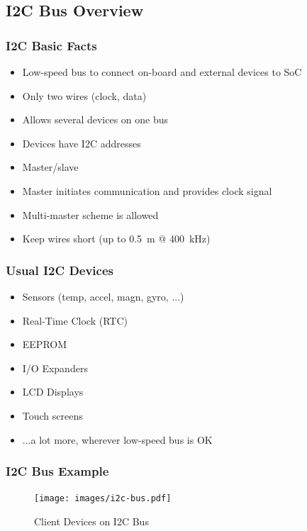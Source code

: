 
\subsection{I2C Bus Overview}

\begin{frame}
  \frametitle{I2C Basic Facts}
  \begin{itemize}
    \item Low-speed bus to connect on-board and external devices to SoC
    \item Only two wires (clock, data)
    \item Allows several devices on one bus
    \item Devices have I2C addresses
    \item Master/slave
    \item Master initiates communication and provides clock signal
    \item Multi-master scheme is allowed
    \item Keep wires short (up to \SI{0.5}{\m} @ \SI{400}{\kilo\Hz})
  \end{itemize}
\end{frame}

\begin{frame}
  \frametitle{Usual I2C Devices}
  \begin{itemize}
    \item Sensors (temp, accel, magn, gyro, ...)
    \item Real-Time Clock (RTC)
    \item EEPROM
    \item I/O Expanders
    \item LCD Displays
    \item Touch screens
    \item ...a lot more, wherever low-speed bus is OK
  \end{itemize}
\end{frame}

\begin{frame}
  \frametitle{I2C Bus Example}
  \begin{figure}
    \centering
    \texttt{[image: images/i2c-bus.pdf]}
    \caption{Client Devices on I2C Bus}
  \end{figure}
\end{frame}


